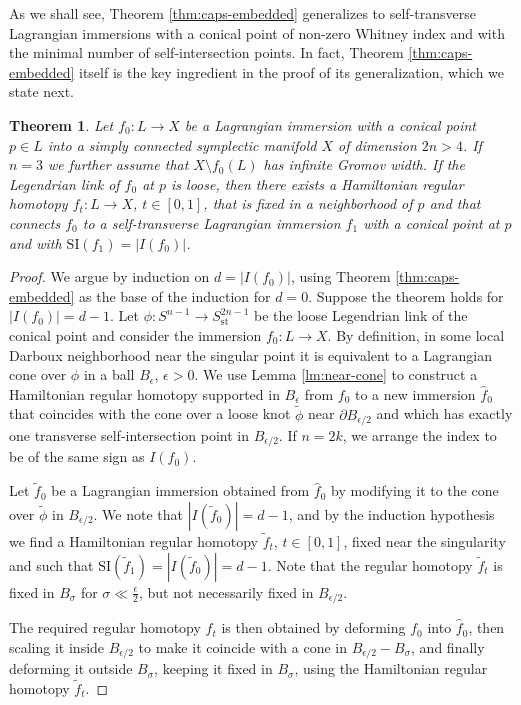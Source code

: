 \documentclass[reqno,11pt]{amsart}
\numberwithin{equation}{section}
\theoremstyle{my}
\theoremstyle{my}
\newtheorem{thm}{Theorem}[section]
\theoremstyle{your}
\newcommand{\st}{\mathrm{st}}
\newcommand{\SI}{\mathrm{SI}}
\newcommand{\p}{\partial }
\newcommand{\eps}{\epsilon}
\newcommand{\wt}{\widetilde}
\newcommand{\wh}{\widehat}
\begin{document}
As we shall see,  Theorem \ref{thm:caps-embedded} generalizes to self-transverse Lagrangian immersions with a conical point of non-zero Whitney index and with the minimal number of self-intersection points. In fact, Theorem \ref{thm:caps-embedded} itself is the key ingredient in the proof of its generalization, which we state next.
  
\begin{thm}\label{cor:caps-immersed}
Let $f_0\colon L\to X$ be a Lagrangian immersion with a conical point $p\in L$ into a  simply connected symplectic manifold $X$ of dimension $2n>4$.  If $n=3$ we further assume  that $X\setminus 
f_0(L)$ has infinite Gromov width.  If the Legendrian link of $f_0$ at $p$ is loose, then there exists a Hamiltonian  regular homotopy $f_t\colon L\to X$, $t\in [0,1]$, that is fixed in a neighborhood of $p$ and that connects $f_0$ to a self-transverse Lagrangian immersion $f_1$ with a conical point at $p$ and with $\SI(f_1)=|I({f_0})|$.
\end{thm}
  
\begin{proof}
We argue by induction on $d=|I({f_0})|$, using Theorem \ref{thm:caps-embedded} as the base of the induction for $d=0$.
Suppose the theorem holds for $|I({f_0})|=d-1$.
Let $\phi\colon S^{n-1}\to S^{2n-1}_\st$ be the loose  Legendrian link of the conical point and consider the immersion  $f_0\colon L\to X$. By definition, in some local Darboux neighborhood  near the singular point it is equivalent to a Lagrangian cone over $\phi$ in a ball $B_\eps$, $\eps>0$.
We use Lemma \ref{lm:near-cone} to construct a Hamiltonian regular homotopy supported in $B_\eps$ from $f_0$ to a new immersion $\wh f_0$ that coincides with the cone over  a loose knot  $\wt \phi$   near $\p B_{\eps/2}$ and which has exactly one transverse self-intersection point in $B_{\eps/2}$. If $n=2k $, we arrange  the index  to be of the same sign as $I(f_0)$.  
        
Let $\wt f_0$ be a Lagrangian immersion obtained from $\wh f_0$ by modifying it to the cone over $\wt\phi$ in $B_{\eps/2}$. We note that $|I(\wt f_0)|=d-1$, and by the induction hypothesis we find a Hamiltonian regular homotopy $\wt f_t$, $t\in[0,1]$,  fixed near the singularity and such that $\SI(\wt f_1)=|I(\wt f_0)|=d-1$.
 Note that the regular homotopy $\wt f_t$ is fixed in $B_\sigma$ for $\sigma\ll\frac\eps2$, but not necessarily fixed in $B_{\eps/2}$.
 
The required regular homotopy $f_t$ is then obtained by deforming $f_0$ into $\wh f_0$,
then scaling it inside $B_{\eps/2}$ to make it coincide with a  cone in $B_{\eps/2}- B_\sigma$, and finally deforming it outside $B_\sigma$, keeping it fixed in $B_\sigma$, using the Hamiltonian regular homotopy $\wt f_t$.
\end{proof}
 
\end{document}
